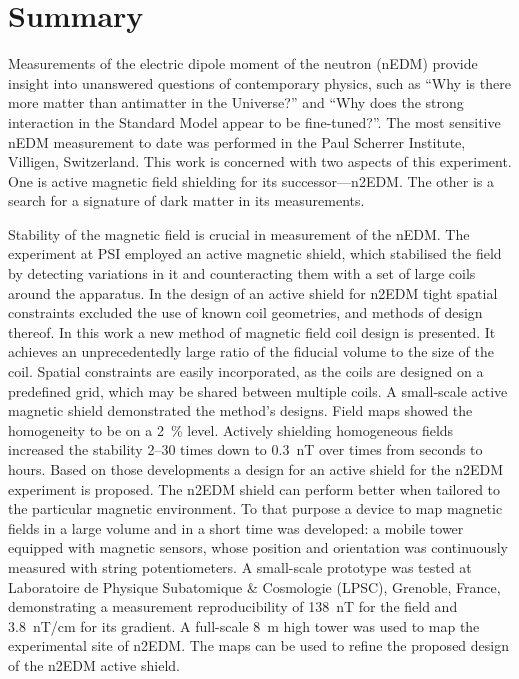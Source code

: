 

\begingroup
\let\clearpage\relax
\let\cleardoublepage\relax
\let\cleardoublepage\relax

\chapter*{Summary} %
Measurements of the electric dipole moment of the neutron (nEDM) provide insight into unanswered questions of contemporary physics, such as ``Why is there more matter than antimatter in the Universe?'' and ``Why does the strong interaction in the Standard Model appear to be fine-tuned?''.
The most sensitive nEDM measurement to date was performed in the Paul Scherrer Institute, Villigen, Switzerland.
This work is concerned with two aspects of this experiment. One is active magnetic field shielding for its successor---n2EDM\@.
The other is a search for a signature of dark matter in its measurements.

Stability of the magnetic field is crucial in measurement of the nEDM\@. The experiment at PSI employed an active magnetic shield, which stabilised the field by detecting  variations in it and counteracting them with a set of large coils around the apparatus.
In the design of an active shield for n2EDM tight spatial constraints excluded the use of known coil geometries, and methods of design thereof.
In this work a new method of magnetic field coil design is presented. It achieves an unprecedentedly large ratio of the fiducial volume to the size of the coil.
Spatial constraints are easily incorporated, as the coils are designed on a predefined grid, which may be shared between multiple coils.
A small-scale active magnetic shield demonstrated the method's designs. Field maps showed the homogeneity to be on a \SI{2}{\percent} level.
Actively shielding homogeneous fields increased the stability 2--30 times down to \SI{0.3}{nT} over times from seconds to hours.
Based on those developments a design for an active shield for the n2EDM experiment is proposed.
The n2EDM shield can perform better when tailored to the particular magnetic environment.
To that purpose a device to map magnetic fields in a large volume and in a short time was developed: a mobile tower equipped with magnetic sensors, whose position and orientation was continuously measured with string potentiometers.
A small-scale prototype was tested at Laboratoire de Physique Subatomique \& Cosmologie (LPSC), Grenoble, France, demonstrating a measurement reproducibility of \SI{138}{nT} for the field and \SI{3.8}{nT/cm} for its gradient.
A full-scale \SI{8}{m} high tower was used to map the experimental site of n2EDM\@.
The maps can be used to refine the proposed design of the n2EDM active shield.

